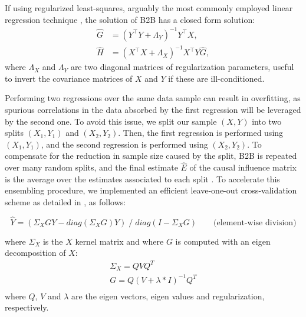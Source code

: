\documentclass{article}
\begin{document}
If using regularized least-squares, arguably the most commonly employed linear regression technique \citep{hoerl1959optimum, rifkin2007notes}, the solution of B2B has a closed form solution:
\begin{align}
    \hat G &= (Y^\top Y + \Lambda_Y)^{-1} Y^\top X,\label{eq:solG}\\
    \hat H &=(X^\top X + \Lambda_X)^{-1} X^\top Y \hat G,\label{eq:solH}
\end{align}
%
where $\Lambda_X$ and $\Lambda_Y$ are two diagonal matrices of regularization parameters, useful to invert the covariance matrices of $X$ and $Y$ if these are ill-conditioned.

Performing two regressions over the same data sample can result in overfitting, as spurious correlations in the data absorbed by the first regression will be leveraged by the second one.
%
To avoid this issue, we split our sample $(X, Y)$ into two splits $(X_1, Y_1)$ and $(X_2, Y_2)$.
%
Then, the first regression is performed using $(X_1, Y_1)$, and the second regression is performed using $(X_2, Y_2)$.
%
To compensate for the reduction in sample size caused by the split, B2B is repeated over many random splits, and the final estimate $\hat E$ of the causal influence matrix is the average over the estimates associated to each split \citep{efron1992bootstrap}.
%
To accelerate this ensembling procedure, we implemented an efficient leave-one-out cross-validation scheme as detailed in \citep{rifkin2007notes} %
, as follows:
%

\begin{equation}
\hat{Y} = (\Sigma_X G Y - diag(\Sigma_X G) Y) \;/\; diag(I - \Sigma_X G) \qquad \text{(element-wise division)}
\end{equation}

where $\Sigma_X$ is the $X$ kernel matrix and where $G$ is computed with an eigen decomposition of $X$:
\begin{equation}
  \begin{aligned}
  \Sigma_X = Q V Q^T \\
  G = Q (V + \lambda*I)^{-1} Q^T\\
  \end{aligned}
\end{equation}
where $Q$, $V$ and $\lambda$ are the eigen vectors, eigen values and regularization, respectively.

%
\end{document}
